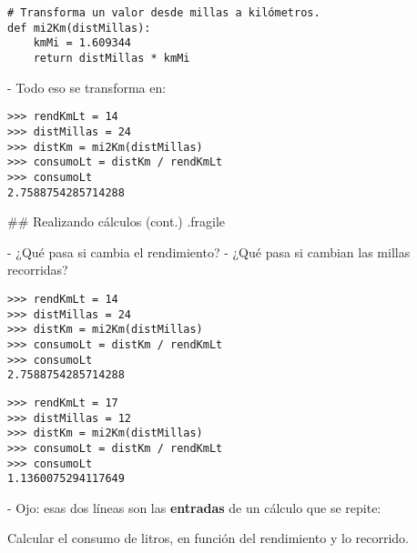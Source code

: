 

\begin{lstlisting}[linebackgroundcolor={%
        \btLstHL{2-4}%
}]
# Transforma un valor desde millas a kilómetros.
def mi2Km(distMillas):
    kmMi = 1.609344
    return distMillas * kmMi
\end{lstlisting}

\trmcolumns

\pause

- Todo eso se transforma en:

\vspace{-2ex}

\bgncolumns
{}
\begin{lstlisting}[linebackgroundcolor={%
        \btLstHL{3}%
}]
>>> rendKmLt = 14
>>> distMillas = 24
>>> distKm = mi2Km(distMillas)
>>> consumoLt = distKm / rendKmLt
>>> consumoLt
2.7588754285714288
\end{lstlisting}


\trmcolumns

## Realizando cálculos (cont.) {.fragile}

\bgnblocknormal

- ¿Qué pasa si cambia el rendimiento?
- ¿Qué pasa si cambian las millas recorridas?

\trmblocknormal

\bgncolumns
{}
\begin{lstlisting}[linebackgroundcolor={%
        \btLstHL{1-2}%
}]
>>> rendKmLt = 14
>>> distMillas = 24
>>> distKm = mi2Km(distMillas)
>>> consumoLt = distKm / rendKmLt
>>> consumoLt
2.7588754285714288
\end{lstlisting}

\begin{lstlisting}[linebackgroundcolor={\btLstHL{1-2}}]
>>> rendKmLt = 17
>>> distMillas = 12
>>> distKm = mi2Km(distMillas)
>>> consumoLt = distKm / rendKmLt
>>> consumoLt
1.1360075294117649
\end{lstlisting}

\trmcolumns

\bgncolumns
{}

- Ojo: esas dos líneas son las \textbf{entradas} de un cálculo que se repite:

\bgnblocknormal
Calcular el consumo de litros, en función del rendimiento y lo recorrido.
\trmblocknormal


